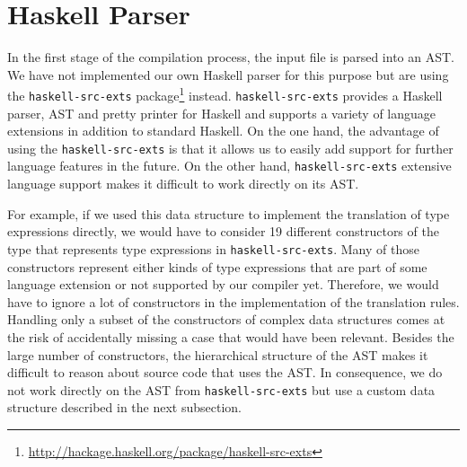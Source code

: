 \section{Haskell Parser} \label{sec:implementation:haskell-src-exts}
In the first stage of the compilation process, the input file is parsed into an AST.
We have not implemented our own Haskell parser for this purpose but are using the \texttt{haskell-src-exts} package\footnote{\url{http://hackage.haskell.org/package/haskell-src-exts}} instead.
\texttt{haskell-src-exts} provides a Haskell parser, AST and pretty printer for Haskell and supports a variety of language extensions in addition to standard Haskell.
On the one hand, the advantage of using the \texttt{haskell-src-exts} is that it allows us to easily add support for further language features in the future.
On the other hand, \texttt{haskell-src-exts} extensive language support makes it difficult to work directly on its AST.

For example, if we used this data structure to implement the translation of type expressions directly, we would have to consider 19 different constructors of the type that represents type expressions in \texttt{haskell-src-exts}.
Many of those constructors represent either kinds of type expressions that are part of some language extension or not supported by our compiler yet.
Therefore, we would have to ignore a lot of constructors in the implementation of the translation rules.
Handling only a subset of the constructors of complex data structures comes at the risk of accidentally missing a case that would have been relevant.
Besides the large number of constructors, the hierarchical structure of the AST makes it difficult to reason about source code that uses the AST.
In consequence, we do not work directly on the AST from \texttt{haskell-src-exts} but use a custom data structure described in the next subsection.
